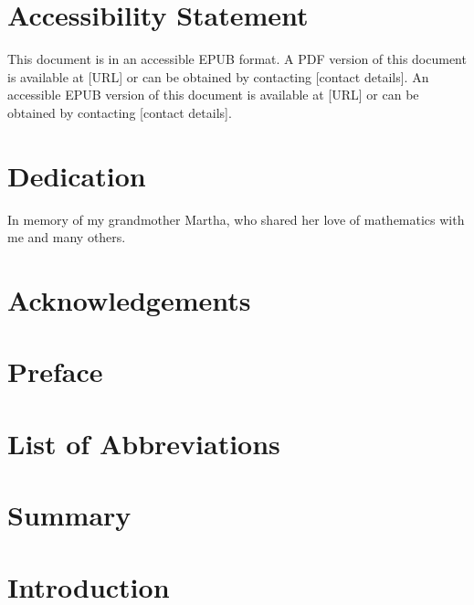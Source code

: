 \documentclass[12pt,reqno,oneside]{amsbook}
\begin{document}
\setcounter{page}{2} %

\chapter*{Accessibility Statement}
\iflatexml
\noindent
This document is in an accessible EPUB format. A PDF version of this document is available at [URL] or can be obtained by contacting [contact details].
\else
\noindent
An accessible EPUB version of this document is available at [URL] or can be obtained by contacting [contact details].
\fi


\chapter*{Dedication}

In memory of my grandmother Martha, who shared her love of mathematics with me and many others.

\chapter*{Acknowledgements}


\chapter*{Preface}


\tableofcontents
\listoffigures
\listoftables

\chapter*{List of Abbreviations}


\chapter*{Summary}



\mainmatter


\chapter{Introduction}
\end{document}
